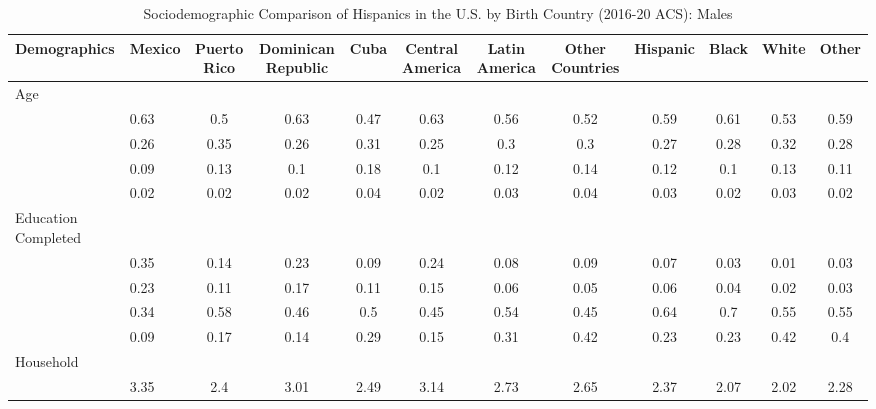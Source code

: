 \begin{table}[ht]
\centering
\caption{Sociodemographic Comparison of Hispanics in the U.S. by Birth Country (2016-20 ACS): Males} 
\begingroup\small
\begin{tabular}{>{\raggedright\arraybackslash}p{3.2cm}|lcccccc|cccc}
  \hline
Demographics & Mexico & Puerto Rico & Dominican Republic & Cuba & Central America & Latin America & Other Countries & Hispanic & Black & White & Other \\ 
  \hline
Age &  &  &  &  &  &  &  &  &  &  &  \\ 
  \multicolumn{1}{>{\raggedleft\arraybackslash}p{1.5cm}|}{\makebox[1.5cm][r]{60 - 69 }}& 0.63 & 0.5 & 0.63 & 0.47 & 0.63 & 0.56 & 0.52 & 0.59 & 0.61 & 0.53 & 0.59 \\ 
  \multicolumn{1}{>{\raggedleft\arraybackslash}p{1.5cm}|}{\makebox[1.5cm][r]{70 - 79 }}& 0.26 & 0.35 & 0.26 & 0.31 & 0.25 & 0.3 & 0.3 & 0.27 & 0.28 & 0.32 & 0.28 \\ 
  \multicolumn{1}{>{\raggedleft\arraybackslash}p{1.5cm}|}{\makebox[1.5cm][r]{80 - 89 }}& 0.09 & 0.13 & 0.1 & 0.18 & 0.1 & 0.12 & 0.14 & 0.12 & 0.1 & 0.13 & 0.11 \\ 
  \multicolumn{1}{>{\raggedleft\arraybackslash}p{1.5cm}|}{\makebox[1.5cm][r]{90 plus }}& 0.02 & 0.02 & 0.02 & 0.04 & 0.02 & 0.03 & 0.04 & 0.03 & 0.02 & 0.03 & 0.02 \\ 
  Education Completed &  &  &  &  &  &  &  &  &  &  &  \\ 
  \multicolumn{1}{>{\raggedleft\arraybackslash}p{3.2cm}|}{\makebox[3.2cm][r]{Less than Primary }}& 0.35 & 0.14 & 0.23 & 0.09 & 0.24 & 0.08 & 0.09 & 0.07 & 0.03 & 0.01 & 0.03 \\ 
  \multicolumn{1}{>{\raggedleft\arraybackslash}p{1.7cm}|}{\makebox[1.7cm][r]{Primary }}& 0.23 & 0.11 & 0.17 & 0.11 & 0.15 & 0.06 & 0.05 & 0.06 & 0.04 & 0.02 & 0.03 \\ 
  \multicolumn{1}{>{\raggedleft\arraybackslash}p{2cm}|}{\makebox[2cm][r]{Secondary }}& 0.34 & 0.58 & 0.46 & 0.5 & 0.45 & 0.54 & 0.45 & 0.64 & 0.7 & 0.55 & 0.55 \\ 
  \multicolumn{1}{>{\raggedleft\arraybackslash}p{2cm}|}{\makebox[2cm][r]{University }}& 0.09 & 0.17 & 0.14 & 0.29 & 0.15 & 0.31 & 0.42 & 0.23 & 0.23 & 0.42 & 0.4 \\ 
  Household &  &  &  &  &  &  &  &  &  &  &  \\ 
  \multicolumn{1}{>{\raggedleft\arraybackslash}p{2.7cm}|}{\makebox[2.7cm][r]{Household Size }}& 3.35 & 2.4 & 3.01 & 2.49 & 3.14 & 2.73 & 2.65 & 2.37 & 2.07 & 2.02 & 2.28 \\ 

\end{tabular}
\end{table}
